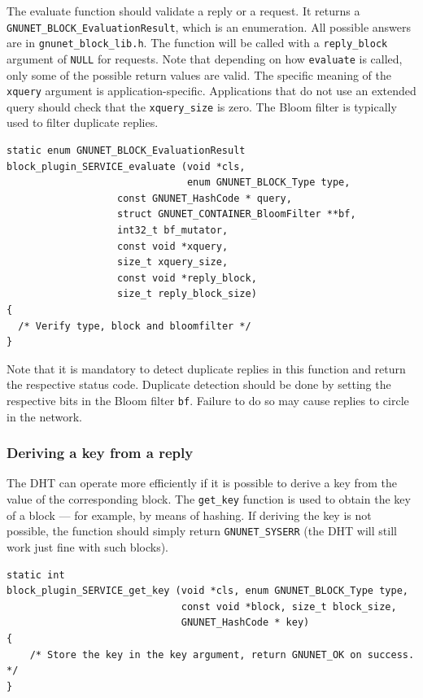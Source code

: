 \documentclass[10pt]{article}
\begin{document}
The evaluate function should validate a reply or a request. It returns
a {\tt GNUNET\_BLOCK\_EvaluationResult}, which is an enumeration. All
possible answers are in {\tt gnunet\_block\_lib.h}.  The function will
be called with a {\tt reply\_block} argument of {\tt NULL} for
requests.  Note that depending on how {\tt evaluate} is called, only
some of the possible return values are valid.  The specific meaning of
the {\tt xquery} argument is application-specific.  Applications that
do not use an extended query should check that the {\tt xquery\_size}
is zero.  The Bloom filter is typically used to filter duplicate
replies.

\lstset{language=C}
\begin{lstlisting}
static enum GNUNET_BLOCK_EvaluationResult
block_plugin_SERVICE_evaluate (void *cls,
                               enum GNUNET_BLOCK_Type type,
			       const GNUNET_HashCode * query,
			       struct GNUNET_CONTAINER_BloomFilter **bf,
			       int32_t bf_mutator,
			       const void *xquery,
			       size_t xquery_size,
			       const void *reply_block,
			       size_t reply_block_size)
{
  /* Verify type, block and bloomfilter */
}
\end{lstlisting}

Note that it is mandatory to detect duplicate replies in this
function and return the respective status code.  Duplicate
detection should be done by setting the respective bits in
the Bloom filter {\tt bf}.  Failure to do so may cause replies
to circle in the network.

\subsubsection{Deriving a key from a reply}

The DHT can operate more efficiently if it is possible to derive a key
from the value of the corresponding block.  The {\tt get\_key}
function is used to obtain the key of a block --- for example, by
means of hashing.  If deriving the key is not possible, the function
should simply return {\tt GNUNET\_SYSERR} (the DHT will still work
just fine with such blocks).

\lstset{language=C}
\begin{lstlisting}
static int
block_plugin_SERVICE_get_key (void *cls, enum GNUNET_BLOCK_Type type,
                              const void *block, size_t block_size,
                              GNUNET_HashCode * key)
{
    /* Store the key in the key argument, return GNUNET_OK on success. */
}
\end{lstlisting}
\end{document}
